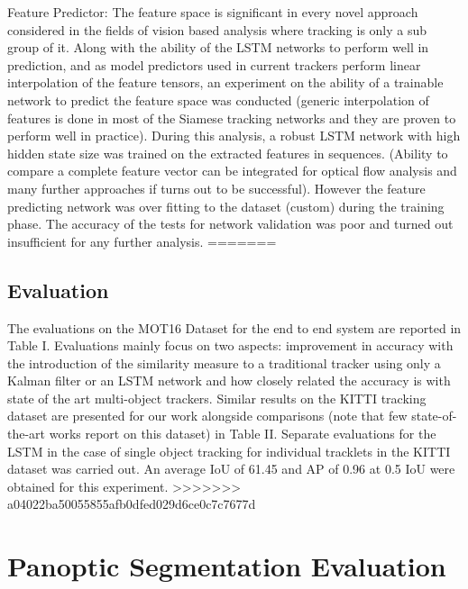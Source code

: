 Feature Predictor: The feature space is significant in every novel approach considered in the fields of vision based analysis where tracking is only a sub group of it. Along with the ability of the LSTM networks to perform well in prediction, and as model predictors used in current trackers perform linear interpolation of the feature tensors, an experiment on the ability of a trainable network to predict the feature space was conducted (generic interpolation of features is done in most of the Siamese tracking networks and they are proven to perform well in practice).
During this analysis, a robust LSTM network with high hidden state size was trained on the extracted features in sequences. (Ability to compare a complete feature vector can be integrated for optical flow analysis and many further approaches if turns out to be successful). However the feature predicting network was over fitting to the dataset (custom) during the training phase. The accuracy of the tests for network validation was poor and turned out insufficient for any further analysis.
=======
\subsection{Evaluation}
The evaluations on the MOT16 Dataset for the end to end system are reported in Table I. Evaluations mainly focus on two aspects: improvement in accuracy with the introduction of the similarity measure to a traditional tracker using only a Kalman filter or an LSTM network and how closely related the accuracy is with state of the art multi-object trackers. Similar results on the KITTI tracking dataset are presented for our work alongside comparisons (note that few state-of-the-art works report on this dataset) in Table II. Separate evaluations for the LSTM in the case of single object tracking for individual tracklets in the KITTI dataset was carried out. An average IoU of 61.45 and AP of 0.96 at 0.5 IoU were obtained for this experiment.
>>>>>>> a04022ba50055855afb0dfed029d6ce0c7c7677d


\section{Panoptic Segmentation Evaluation}







